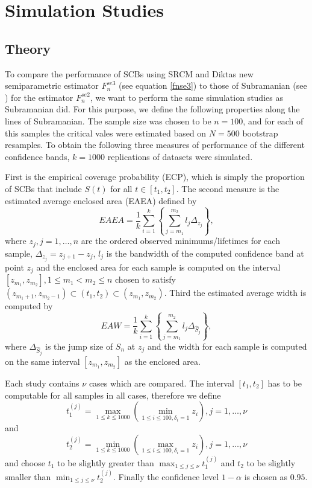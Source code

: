 \chapter{Simulation Studies}

\section{Theory}

To compare the performance of SCBs using SRCM and Diktas new semiparametric estimator  $F_n^{se3}$ (see equation \ref{fnse3}) to those of Subramanian (see \cite{PAPER5}) for the estimator $F_n^{se2}$, we want to perform the same simulation studies as Subramanian did. For this purpose, we define the following properties along the lines of Subramanian.
The sample size was chosen to be $n=100$, and for each of this samples the critical vales were estimated based on $N=500$ bootstrap resamples. To obtain the following three measures of performance of the different confidence bands, $k=1000$ replications of datasets were simulated.

First is the empirical coverage probability (ECP), which is simply the proportion of SCBs that include $S(t)$ for all $t \in [t_1,t_2]$. 
The second measure is the estimated average enclosed area (EAEA) defined by
\[
EAEA = \frac{1}{k} \sum_{i=1}^k \left\{ \sum_{j=m_1}^{m_2} l_j\Delta_{z_j}\right\},
\]
where $z_j, j=1,\ldots,n$ are the ordered observed minimums/lifetimes for each sample,
$\Delta_{z_j} = z_{j+1}-z_j$, $l_j$ is the bandwidth of the computed confidence band at point $z_j$ 
and the enclosed area for each sample is computed on the interval $[z_{m_1},z_{m_2}], 1 \leq m_1 < m_2 \leq n$ chosen to satisfy $(z_{m_1+1},z_{m_2-1}) \subset (t_1,t_2) \subset (z_{m_1},z_{m_2})$.
Third the estimated average width is computed by
\[
EAW = \frac{1}{k} \sum_{i=1}^k \left\{ \sum_{j=m_1}^{m_2} l_j\Delta_{\hat{S}_j}\right\},
\]
where $\Delta_{\hat{S}_j}$ is the jump size of $S_n$ at $z_j$ and the width for each sample is computed on the same interval $[z_{m_1},z_{m_2}]$ as the enclosed area.

Each study contains $\nu$ cases which are compared. The interval $[t_1,t_2]$ has to be computable for all samples in all cases, therefore we define
\[
t_1^{(j)} = \max_{1\leq k \leq 1000} \left( \min_{1\leq i \leq 100,\delta_i=1} z_i \right), j = 1,\ldots,\nu 
\] 
and
\[
t_2^{(j)} = \min_{1\leq k \leq 1000} \left( \max_{1\leq i \leq 100,\delta_i=1} z_i \right), j = 1,\ldots,\nu 
\]
and choose $t_1$ to be slightly greater than $\max_{1\leq j \leq \nu}t_1^{(j)}$ and $t_2$ to be slightly smaller than  $\min_{1\leq j \leq \nu}t_2^{(j)}$.
Finally the confidence level $1-\alpha$ is chosen as $0.95$.

